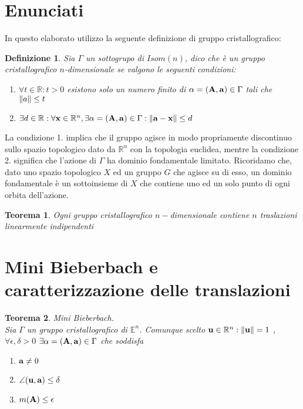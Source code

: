 \documentclass[a4paper]{book}
\newtheorem{definition}{Definizione}[section]
\newtheorem{theorem}{Teorema}[section]
\begin{document}
\section{Enunciati}
In questo elaborato utilizzo la seguente definizione di gruppo cristallografico:
\begin{definition}
Sia $\Gamma$ un sottogrupo di $Isom(n)$, dico che è un gruppo cristallografico $n$-dimensionale se valgono le seguenti condizioni:
\begin{enumerate}
	\item $ \forall t \in \mathbb{R} : t > 0 $  esistono solo un numero finito di $\alpha = \vb{(A, a)} \in \Gamma $  tali che  $\norm{a} \leq t$ 
	\item $ \exists d \in \mathbb{R}: \forall \vb{x} \in \mathbb{R}^n ,  \exists \alpha = \vb{(A,a)} \in \Gamma : \norm{\vb{a-x}}\leq d $
\end{enumerate}
\end{definition}
La condizione 1. implica che il gruppo agisce in modo propriamente discontinuo sullo spazio topologico dato da $\mathbb{R}^n$ con la topologia euclidea, mentre la condizione 2. significa che l'azione di $\Gamma$ ha dominio fondamentale limitato. Ricoridamo che, dato uno spazio topologico $X$ ed un gruppo $G$ che agisce su di esso, un dominio fondamentale è un sottoinsieme di $X$ che contiene uno ed un solo punto di ogni orbita dell'azione.\\
\begin{theorem}
Ogni gruppo cristallografico $n-$dimensionale contiene $n$ traslazioni linearmente indipendenti
\end{theorem}
\newpage 
\section{Mini Bieberbach e caratterizzazione delle translazioni} 
\begin{theorem}{Mini Bieberbach.} \\
Sia $\Gamma$ un gruppo cristallografico di $\mathbb{E}^n$. Comunque scelto $ \vb{u} \in \mathbb{R}^n : \norm{\vb{u}} = 1$ ,\\
$  \forall \epsilon ,\delta >0 $ $   \exists \alpha = \vb{(A,a)} \in \Gamma $ che soddisfa 
\begin{enumerate}
\item $\vb{a} \neq 0$ 
\item $ \angle (\vb{u, a}) \leq \delta $
\item $ m(\vb{A}) \leq \epsilon$ 
\end{enumerate}
\end{theorem}
\end{document}
